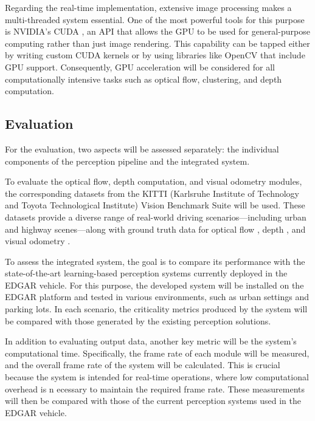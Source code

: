 Regarding the real-time implementation, extensive image processing makes a multi-threaded system essential. 
One of the most powerful tools for this purpose is NVIDIA’s CUDA \cite{cuda_concept}, an API that allows the GPU to be used for 
general-purpose computing rather than just image rendering. This capability can be tapped either by writing custom 
CUDA kernels \cite{cuda_kernels} or by using libraries like OpenCV \cite{cervera_gpu_opencv} that include GPU support. 
Consequently, GPU acceleration will be considered 
for all computationally intensive tasks such as optical flow, clustering, and depth computation.


\subsection{Evaluation}%


For the evaluation, two aspects will be assessed separately: the individual components of the perception pipeline and the integrated system.

To evaluate the optical flow, depth computation, and visual odometry modules, the corresponding datasets from the KITTI 
(Karlsruhe Institute of Technology and Toyota Technological Institute) Vision Benchmark Suite \cite{kitti_dataset} will be used. 
These datasets provide a diverse range of real-world driving scenarios—including urban and highway scenes—along with ground truth data 
for optical flow \cite{kitti_flow_article}, depth \cite{kitti_depth}, and visual odometry \cite{kitti_odom}.

To assess the integrated system, the goal is to compare its performance with the state-of-the-art learning-based perception systems 
currently deployed in the EDGAR vehicle. For this purpose, the developed system will be installed on the EDGAR platform and tested 
in various environments, such as urban settings and parking lots. In each scenario, the criticality metrics produced by the system 
will be compared with those generated by the existing perception solutions.

In addition to evaluating output data, another key metric will be the system’s computational time. 
Specifically, the frame rate of each module will be measured, and the overall frame rate of the system will be calculated. 
This is crucial because the system is intended for real-time operations, where low computational overhead is n
ecessary to maintain the required frame rate. These measurements will then be compared with those of the current perception 
systems used in the EDGAR vehicle.

